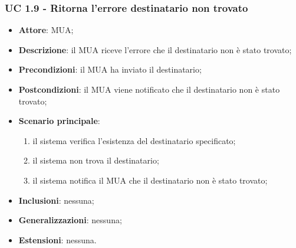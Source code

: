     \subsubsection{UC 1.9 - Ritorna l'errore destinatario non trovato} \label{sec:UC1.9}
    \begin{itemize}
        \item \textbf{Attore}: MUA;
        \item \textbf{Descrizione}: il MUA riceve l'errore che il destinatario non è stato trovato;
        \item \textbf{Precondizioni}: il MUA ha inviato il destinatario;
        \item \textbf{Postcondizioni}: il MUA viene notificato che il destinatario non è stato trovato;
        \item \textbf{Scenario principale}:
            \begin{enumerate}
                \item il sistema verifica l'esistenza del destinatario specificato;
                \item il sistema non trova il destinatario;
                \item il sistema notifica il MUA che il destinatario non è stato trovato;
            \end{enumerate}
        \item \textbf{Inclusioni}: nessuna;
        \item \textbf{Generalizzazioni}: nessuna;
        \item \textbf{Estensioni}: nessuna.
    \end{itemize}

